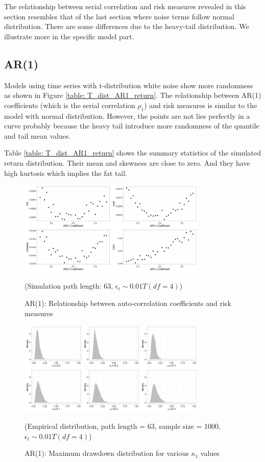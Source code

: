 \documentclass[11pt]{article}
\begin{document}
The relationship between serial correlation and risk measures revealed in this section resembles that of the last section where noise terms follow normal distribution. There are some differences due to the heavy-tail distribution. We illustrate more in the specific model part.

\subsection{AR(1)}

Models using time series with t-distribution white noise show more randomness as shown in Figure \ref{table: T_dist_AR1_return}. The relationship between AR(1) coefficients (which is the serial correlation $\rho_1$) and risk measures is similar to the model with normal distribution. However, the points are not lies perfectly in a curve probably because the heavy tail introduce more randomness of the quantile and tail mean values. 

Table \ref{table: T_dist_AR1_return} shows the summary statistics of the simulated return distribution. Their mean and skewness are close to zero. And they have high kurtosis which implies the fat tail.

\begin{figure}[H]
\centering
\includegraphics[width = 0.8\textwidth]{../figures/simulation/T_dist_AR1_risk_measures}
\caption{AR(1): Relationship between auto-correlation coefficients and risk measures}
(Simulation path length: 63, $\epsilon_t \sim 0.01T(df = 4)$)
\label{fig:T_dist_AR1_risk_measures}
\end{figure}



\begin{figure}[H]
\centering
\includegraphics[width = 0.8\textwidth]{../figures/simulation/T_dist_AR1_maxDrawdown_dist}
\caption{AR(1): Maximum drawdown distribution for various $\kappa_1$ values }
(Empirical distribution, path length = 63, sample size = 1000, $\epsilon_t \sim 0.01T(df = 4)$)
\label{fig:T_dist_AR1_maxDrawdown_dist}
\end{figure}
\end{document}
